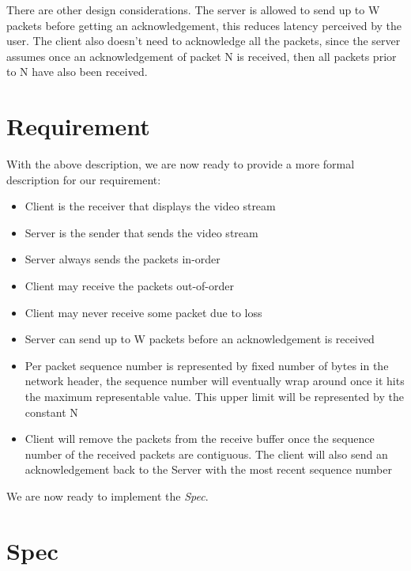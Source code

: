 There are other design considerations. The server is allowed to send up to W
packets before getting an acknowledgement, this reduces latency perceived by the
user. The client also doesn't need to acknowledge all the packets, since the
server assumes once an acknowledgement of packet N is received, then all packets
prior to N have also been received.

\section{Requirement}

With the above description, we are now ready to provide a more formal
description for our requirement:

\begin{itemize}
    \item Client is the receiver that displays the video stream 
    \item Server is the sender that sends the video stream 
    \item Server always sends the packets in-order
    \item Client may receive the packets out-of-order 
    \item Client may never receive some packet due to loss
    \item Server can send up to W packets before an acknowledgement is received
    \item Per packet sequence number is represented by fixed number of bytes in
    the network header, the sequence number will eventually wrap around once it
    hits the maximum representable value. This upper limit will be represented
    by the constant N 
    \item Client will remove the packets from the receive buffer once the
    sequence number of the received packets are contiguous. The client will also
    send an acknowledgement back to the Server with the most recent sequence
    number
\end{itemize}

We are now ready to implement the \textit{Spec}. 

\section{Spec}
